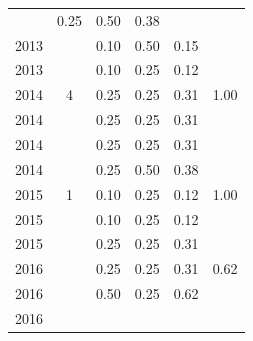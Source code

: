 \begin{table}[H]
\begin{tabular}{| l | c | c | c | c | c |}
          &
          0.25
          &
          0.50
          &
          0.38
          &
          \\
            2013
          &
          
          &
          0.10
          &
          0.50
          &
          0.15
          &
          \\
            2013
          &
          
          &
          0.10
          &
          0.25
          &
          0.12
          &
          \\
\hline
            2014
          &
          4
          &
          0.25
          &
          0.25
          &
          0.31
          &
            {\color{blue} 1.00}
          \\
            2014
          &
          
          &
          0.25
          &
          0.25
          &
          0.31
          &
          \\
            2014
          &
          
          &
          0.25
          &
          0.25
          &
          0.31
          &
          \\
            2014
          &
          
          &
          0.25
          &
          0.50
          &
          0.38
          &
          \\
\hline
            2015
          &
          1
          &
          0.10
          &
          0.25
          &
          0.12
          &
            {\color{blue} 1.00}
          \\
            2015
          &
          
          &
          0.10
          &
          0.25
          &
          0.12
          &
          \\
            2015
          &
          
          &
          0.25
          &
          0.25
          &
          0.31
          &
          \\
\hline
            2016
          &
          
          &
          0.25
          &
          0.25
          &
          0.31
          &
            {\color{blue} 0.62}
          \\
            2016
          &
          
          &
          0.50
          &
          0.25
          &
          0.62
          &
          \\
            2016
          &
          

\end{tabular}
\end{table}
